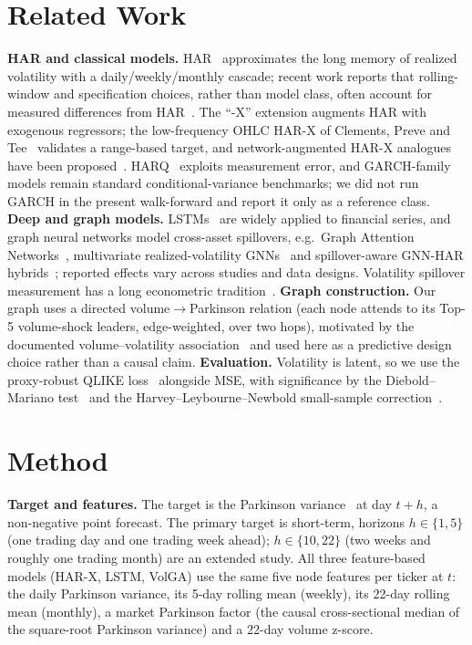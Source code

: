 \documentclass[runningheads]{llncs}
\begin{document}
\section{Related Work}
\textbf{HAR and classical models.} HAR~\cite{corsi2009} approximates the long memory of realized
volatility with a daily/weekly/monthly cascade; recent work reports that rolling-window and
specification choices, rather than model class, often account for measured differences from
HAR~\cite{audrino2025}. The ``-X'' extension augments HAR with exogenous regressors; the low-frequency
OHLC HAR-X of Clements, Preve and Tee~\cite{clements2024} validates a range-based target, and
network-augmented HAR-X analogues have been proposed~\cite{gnarharx2025}. HARQ~\cite{harq2016}
exploits measurement error, and GARCH-family models remain standard conditional-variance benchmarks;
we did not run GARCH in the present walk-forward and report it only as a reference class.
\textbf{Deep and graph models.} LSTMs~\cite{lstm1997} are widely applied to financial series, and
graph neural networks model cross-asset spillovers, e.g.\ Graph Attention Networks~\cite{gat2018},
multivariate realized-volatility GNNs~\cite{chen2022} and spillover-aware GNN-HAR
hybrids~\cite{gnnhar2025}; reported effects vary across studies and data designs. Volatility spillover
measurement has a long econometric tradition~\cite{dy2012}. \textbf{Graph construction.} Our graph
uses a directed volume$\to$Parkinson relation (each node attends to its Top-5 volume-shock leaders,
edge-weighted, over two hops), motivated by the documented volume--volatility
association~\cite{karpoff1987} and used here as a predictive design choice rather than a causal claim.
\textbf{Evaluation.}
Volatility is latent, so we use the proxy-robust QLIKE loss~\cite{patton2011} alongside MSE, with
significance by the Diebold--Mariano test~\cite{dm1995} and the Harvey--Leybourne--Newbold
small-sample correction~\cite{hln1997}.

\section{Method}
\textbf{Target and features.} The target is the Parkinson variance~\cite{parkinson1980} at day
$t{+}h$, a non-negative point forecast. The primary target is short-term, horizons $h\in\{1,5\}$
(one trading day and one trading week ahead); $h\in\{10,22\}$ (two weeks and roughly one trading
month) are an extended study. All three feature-based models (HAR-X, LSTM, VolGA) use the same five
node features per ticker at $t$: the daily Parkinson variance, its 5-day rolling mean (weekly), its
22-day rolling mean (monthly), a market Parkinson factor (the causal cross-sectional median of the
square-root Parkinson variance) and a 22-day volume z-score.
\end{document}
